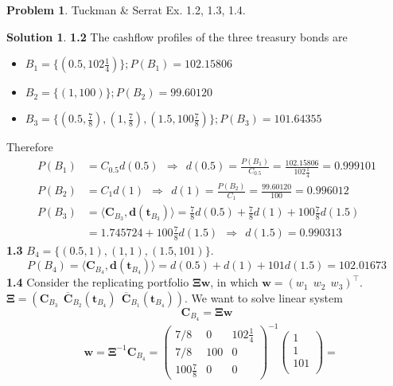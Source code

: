 \documentclass[a4paper, 10pt]{article}
\theoremstyle{definition}
\newtheorem{problem}{Problem}
\theoremstyle{hSol}
\newtheorem*{solution}{Solution}
\begin{document}
\begin{problem} Tuckman \& Serrat Ex. 1.2, 1.3, 1.4.
\end{problem}
\begin{solution} \textbf{1.2} The cashflow profiles of the three treasury bonds are
\begin{itemize}
  \item[] $B_1 = \{(0.5, 102\tfrac{1}{4})\}; P(B_1) = 102.15806$
  \item[] $B_2 = \{(1, 100)\}; P(B_2) = 99.60120$
  \item[] $B_3 = \{(0.5, \tfrac{7}{8}), (1, \tfrac{7}{8}), (1.5, 100\tfrac{7}{8})\}; P(B_3) = 101.64355$
\end{itemize}
Therefore
\begin{equation}
  \begin{split}
    P(B_1) &= C_{0.5} d(0.5) ~~\Rightarrow~~d(0.5) = \frac{P(B_1)}{C_{0.5}} = \frac{102.15806}{102\tfrac{1}{4}} = 0.999101\\
    P(B_2) &= C_1d(1) ~~ \Rightarrow~~ d(1) = \frac{P(B_2)}{C_1} = \frac{99.60120}{100} = 0.996012\\
    P(B_3) &= \langle \bm{C}_{B_3}, \bm{d}(\bm{t}_{B_3}) \rangle = \tfrac{7}{8}d(0.5) + \tfrac{7}{8}d(1) + 100\tfrac{7}{8}d(1.5) \\
    &=1.745724 + 100\tfrac{7}{8}d(1.5) ~~\Rightarrow  ~~d(1.5) = 0.990313
  \end{split}
\end{equation}
\textbf{1.3} $B_4 = \{(0.5, 1), (1, 1), (1.5, 101)\}$.
$$
P(B_4) = \langle \bm{C}_{B_4}, \bm{d}(\bm{t}_{B_4}) \rangle = d(0.5) + d(1) + 101d(1.5) = 102.01673
$$
\textbf{1.4} Consider the replicating portfolio $\bm{\Xi w}$, in which $\bm{w}=(w_1 ~~ w_2 ~~ w_3)^{\top}$. $\bm{\Xi} = (\bm{C}_{B_3}~~ \overline{\bm{C}}_{B_2}(\bm{t}_{B_4})~~\overline{\bm{C}}_{B_1}(\bm{t}_{B_4}))$. We want to solve linear system
$$
\bm{C}_{B_4} =  \bm{\Xi w}
$$
\begin{equation}
\begin{split}
  &\bm{w} = \bm{\Xi}^{-1} \bm{C}_{B_4} = 
  \begin{pmatrix}
    7/8 & 0 & 102\tfrac{1}{4}\\
    7/8 & 100 & 0\\
    100\tfrac{7}{8} & 0 & 0
  \end{pmatrix}^{-1}
  \begin{pmatrix}
    1 \\
    1 \\
    101\\
  \end{pmatrix} = 

\end{split}
\end{equation}
\end{solution}
\end{document}
